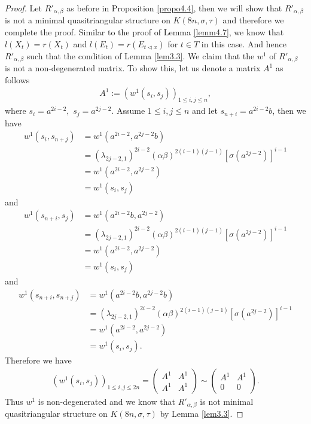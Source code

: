 \documentclass[a4paper,11pt]{amsart}
\numberwithin{equation}{section}
\begin{document}
\begin{proof}
Let $R'_{\alpha,\beta}$ as before in Proposition \ref{propo4.4}, then we will show that $R'_{\alpha,\beta}$ is not a minimal quasitriangular structure on $K(8n,\sigma,\tau)$ and therefore we complete the proof. Similar to the proof of Lemma \ref{lemm4.7}, we know that $l(X_t)=r(X_t)$ and $l(E_t)=r(E_{t\triangleleft x})$ for $t\in T$ in this case. And hence $R'_{\alpha,\beta}$ such that the condition of Lemma \ref{lem3.3}. We claim that the $w^1$ of $R'_{\alpha,\beta}$ is not a non-degenerated matrix. To show this, let us denote a matrix $A^{1}$ as follows
\begin{gather*}
A^1:=(w^1(s_i,s_j))_{1\leq i,j \leq n},
\end{gather*}
where $s_i=a^{2i-2},$ $s_j=a^{2j-2}$. Assume $1\leq i,j \leq n$ and let $s_{n+i}=a^{2i-2}b$, then we have
\begin{align*}
w^1(s_i,s_{n+j})&=w^1(a^{2i-2},a^{2j-2}b)\\
&=(\lambda_{2j-2,1})^{2i-2} (\alpha \beta)^{2(i-1)(j-1)}[\sigma(a^{2j-2})]^{i-1}\\
&=w^1(a^{2i-2},a^{2j-2})\\
&=w^1(s_i,s_j)
\end{align*}
and
\begin{align*}
w^1(s_{n+i},s_{j})&=w^1(a^{2i-2}b,a^{2j-2})\\
&=(\lambda_{2j-2,1})^{2i-2} (\alpha \beta)^{2(i-1)(j-1)}[\sigma(a^{2j-2})]^{i-1}\\
&=w^1(a^{2i-2},a^{2j-2})\\
&=w^1(s_i,s_j)
\end{align*}
and
\begin{align*}
w^1(s_{n+i},s_{n+j})&=w^1(a^{2i-2}b,a^{2j-2}b)\\
&=(\lambda_{2j-2,1})^{2i-2} (\alpha \beta)^{2(i-1)(j-1)}[\sigma(a^{2j-2})]^{i-1}\\
&=w^1(a^{2i-2},a^{2j-2})\\
&=w^1(s_i,s_j).
\end{align*}
Therefore we have
\begin{gather*}
(w^1(s_i,s_j))_{1\leq i,j \leq 2n} = \begin{pmatrix} A^1 & A^1 \\ A^1 & A^1 \end{pmatrix} \sim \begin{pmatrix} A^1 & A^1 \\ 0 & 0 \end{pmatrix}.
\end{gather*}
  Thus $w^1$ is non-degenerated and we know that $R'_{\alpha,\beta}$ is not minimal quasitriangular structure on $K(8n,\sigma,\tau)$ by Lemma \ref{lem3.3}.
\end{proof}
\end{document}

